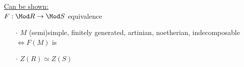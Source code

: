 \begin{thm}
\end{thm}

\underline{Can be shown:}\\
$F: \Mod R \to \Mod S$ equivalence
\begin{enumerate}
\item[$\cdot$] $M$ (semi)simple, finitely generated, artinian, noetherian, indecomposable\\
$\iff F(M)$ is
\item[$\cdot$] $Z(R) \simeq Z(S)$ 
\end{enumerate}